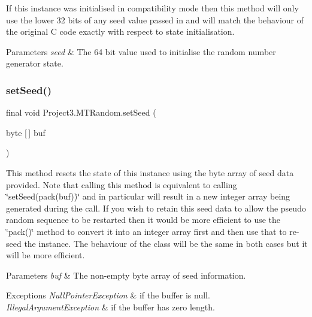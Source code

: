 If this instance was initialised in \textquotesingle{}compatibility\textquotesingle{} mode then this method will only use the lower 32 bits of any seed value passed in and will match the behaviour of the original C code exactly with respect to state initialisation.


\begin{DoxyParams}{Parameters}
{\em seed} & The 64 bit value used to initialise the random number generator state. \\
\hline
\end{DoxyParams}
\mbox{\label{class_project3_1_1_m_t_random_a3f346d0c56b39096e1a29f2bf12c2dec}} 
\subsubsection{\texorpdfstring{setSeed()}{setSeed()}\hspace{0.1cm}{\footnotesize\ttfamily [2/3]}}
{\footnotesize\ttfamily final void Project3.\+M\+T\+Random.\+set\+Seed (\begin{DoxyParamCaption}\item[{byte \mbox{[}$\,$\mbox{]}}]{buf }\end{DoxyParamCaption})}

This method resets the state of this instance using the byte array of seed data provided. Note that calling this method is equivalent to calling \char`\"{}set\+Seed(pack(buf))\char`\"{} and in particular will result in a new integer array being generated during the call. If you wish to retain this seed data to allow the pseudo random sequence to be restarted then it would be more efficient to use the \char`\"{}pack()\char`\"{} method to convert it into an integer array first and then use that to re-\/seed the instance. The behaviour of the class will be the same in both cases but it will be more efficient.


\begin{DoxyParams}{Parameters}
{\em buf} & The non-\/empty byte array of seed information. \\
\hline
\end{DoxyParams}

\begin{DoxyExceptions}{Exceptions}
{\em Null\+Pointer\+Exception} & if the buffer is null. \\
\hline
{\em Illegal\+Argument\+Exception} & if the buffer has zero length. \\
\hline
\end{DoxyExceptions}
\mbox{\label{class_project3_1_1_m_t_random_a4ac05e6ef57dbaa67596e3de3d9e5d49}} 
